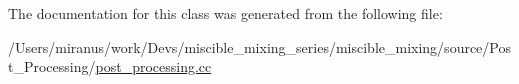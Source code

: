 The documentation for this class was generated from the following file\+:\begin{DoxyCompactItemize}
\item 
/\+Users/miranus/work/\+Devs/miscible\+\_\+mixing\+\_\+series/miscible\+\_\+mixing/source/\+Post\+\_\+\+Processing/\hyperlink{post__processing_8cc}{post\+\_\+processing.\+cc}\end{DoxyCompactItemize}
